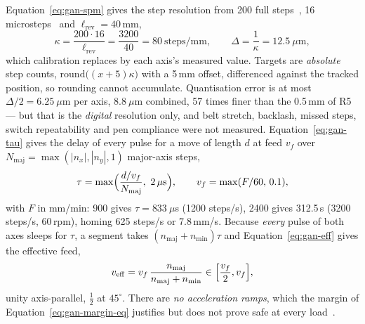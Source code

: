 Equation~\ref{eq:gan-spm} gives the step resolution from 200 full steps~\cite{stepperds}, 16 microsteps~\cite[p.~6]{a4988ds} and $\ell_{\mathrm{rev}}=40$\,mm,
\begin{equation}
\kappa=\frac{200\cdot16}{\ell_{\mathrm{rev}}}=\frac{3200}{40}=80\ \mathrm{steps/mm},\qquad\Delta=\frac1\kappa=12.5\ \mu\mathrm{m},
\label{eq:gan-spm}
\end{equation}
which calibration replaces by each axis's measured value. Targets are \emph{absolute} step counts, $\mathrm{round}\bigl((x+5)\kappa\bigr)$ with a 5\,mm offset, differenced against the tracked position, so rounding cannot accumulate. Quantisation error is at most $\Delta/2=6.25\ \mu$m per axis, $8.8\ \mu$m combined, 57 times finer than the 0.5\,mm of R5 --- but that is the \emph{digital} resolution only, and belt stretch, backlash, missed steps, switch repeatability and pen compliance were not measured.
Equation~\ref{eq:gan-tau} gives the delay of every pulse for a move of length $d$ at feed $v_f$ over $N_{\mathrm{maj}}=\max(|n_x|,|n_y|,1)$ major-axis steps,
\begin{equation}
\tau=\max\Bigl(\frac{d/v_f}{N_{\mathrm{maj}}},\ 2\,\mu\mathrm s\Bigr),\qquad v_f=\max(F/60,\,0.1),
\label{eq:gan-tau}
\end{equation}
with $F$ in mm/min: 900 gives $\tau=833\ \mu$s (1200 steps/s), 2400 gives 312.5\,\textmu s (3200 steps/s, 60\,rpm), homing 625 steps/s or 7.8\,mm/s. Because \emph{every} pulse of both axes sleeps for $\tau$, a segment takes $(n_{\mathrm{maj}}+n_{\mathrm{min}})\tau$ and Equation~\ref{eq:gan-eff} gives the effective feed,
\begin{equation}
v_{\mathrm{eff}}=v_f\,\frac{n_{\mathrm{maj}}}{n_{\mathrm{maj}}+n_{\mathrm{min}}}\in\Bigl[\frac{v_f}{2},v_f\Bigr],
\label{eq:gan-eff}
\end{equation}
unity axis-parallel, $\tfrac12$ at $45^\circ$. There are \emph{no acceleration ramps}, which the margin of Equation~\ref{eq:gan-margin-eq} justifies but does not prove safe at every load~\cite{acarnley2002}.


